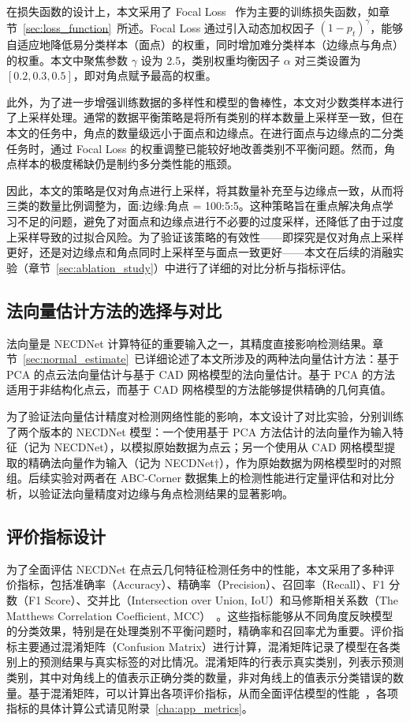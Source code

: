 在损失函数的设计上，本文采用了 Focal Loss~\cite{lin_focal_2020} 作为主要的训练损失函数，如章节~\ref{sec:loss_function}~所述。Focal Loss 通过引入动态加权因子 $(1-p_t)^{\gamma}$，能够自适应地降低易分类样本（面点）的权重，同时增加难分类样本（边缘点与角点）的权重。本文中聚焦参数 $\gamma$ 设为 2.5，类别权重均衡因子 $\alpha$ 对三类设置为 $[0.2, 0.3, 0.5]$，即对角点赋予最高的权重。

此外，为了进一步增强训练数据的多样性和模型的鲁棒性，本文对少数类样本进行了上采样处理。通常的数据平衡策略是将所有类别的样本数量上采样至一致，但在本文的任务中，角点的数量级远小于面点和边缘点。在进行面点与边缘点的二分类任务时，通过 Focal Loss 的权重调整已能较好地改善类别不平衡问题。然而，角点样本的极度稀缺仍是制约多分类性能的瓶颈。

因此，本文的策略是仅对角点进行上采样，将其数量补充至与边缘点一致，从而将三类的数量比例调整为，面:边缘:角点 = 100:5:5。这种策略旨在重点解决角点学习不足的问题，避免了对面点和边缘点进行不必要的过度采样，还降低了由于过度上采样导致的过拟合风险。为了验证该策略的有效性——即探究是仅对角点上采样更好，还是对边缘点和角点同时上采样至与面点一致更好——本文在后续的消融实验（章节~\ref{sec:ablation_study}）中进行了详细的对比分析与指标评估。

\subsection{法向量估计方法的选择与对比}
\label{subsec:normal_estimation}

法向量是 NECDNet 计算特征的重要输入之一，其精度直接影响检测结果。章节~\ref{sec:normal_estimate}~已详细论述了本文所涉及的两种法向量估计方法：基于 PCA 的点云法向量估计与基于 CAD 网格模型的法向量估计。基于 PCA 的方法适用于非结构化点云，而基于 CAD 网格模型的方法能够提供精确的几何真值。

为了验证法向量估计精度对检测网络性能的影响，本文设计了对比实验，分别训练了两个版本的 NECDNet 模型：一个使用基于 PCA 方法估计的法向量作为输入特征（记为 NECDNet），以模拟原始数据为点云；另一个使用从 CAD 网格模型提取的精确法向量作为输入（记为 NECDNet$\dagger$），作为原始数据为网格模型时的对照组。后续实验对两者在 ABC-Corner 数据集上的检测性能进行定量评估和对比分析，以验证法向量精度对边缘与角点检测结果的显著影响。

\subsection{评价指标设计}
\label{sec:metrics}
为了全面评估 NECDNet 在点云几何特征检测任务中的性能，本文采用了多种评价指标，包括准确率（Accuracy）、精确率（Precision）、召回率（Recall）、F1 分数（F1 Score）、交并比（Intersection over Union, IoU）和马修斯相关系数（The Matthews Correlation Coefficient, MCC）~\cite{krstinic_multilabel_2020, chicco_advantages_2020, japkowicz_class_2002a}。这些指标能够从不同角度反映模型的分类效果，特别是在处理类别不平衡问题时，精确率和召回率尤为重要。评价指标主要通过混淆矩阵（Confusion Matrix）进行计算，混淆矩阵记录了模型在各类别上的预测结果与真实标签的对比情况。混淆矩阵的行表示真实类别，列表示预测类别，其中对角线上的值表示正确分类的数量，非对角线上的值表示分类错误的数量。基于混淆矩阵，可以计算出各项评价指标，从而全面评估模型的性能~\cite{duntsch_confusion_2019}，各项指标的具体计算公式请见附录~\ref{cha:app_metrics}。

